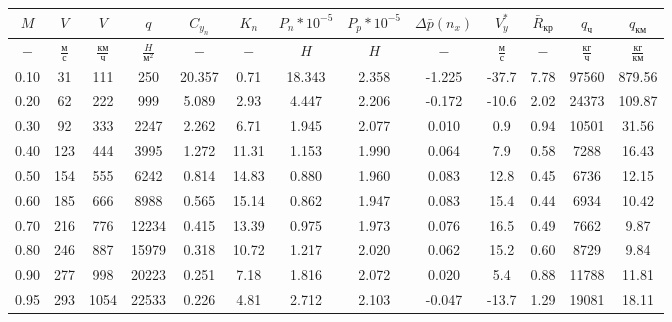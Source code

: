 \begin{tabular}{|c|c|c|c|c|c|c|c|c|c|c|c|c|}
\hline
$M$ & $V$ & $V$ & $q$ & $C_{y_n}$ & $K_n$ & $P_n*10^{-5}$ & $P_p*10^{-5}$ & $\Delta \bar{p}(n_x)$ & $V_y^*$ & $\bar{R}_{кр}$ & $q_{ч}$ & $q_{км}$ \\ 
\hline
$-$ & $\frac{м}{с}$ & $\frac{км}{ч}$ & $\frac{H}{м^2}$ & $-$ & $-$ & $H$ & $H$ & $-$ & $\frac{м}{с}$ & $-$ & $\frac{кг}{ч}$ & $\frac{кг}{км}$ \\ 
\hline
0.10 & 31 & 111 & 250 & 20.357 & 0.71 & 18.343 & 2.358 & -1.225 & -37.7 & 7.78 & 97560 & 879.56 \\ 
\hline
0.20 & 62 & 222 & 999 & 5.089 & 2.93 & 4.447 & 2.206 & -0.172 & -10.6 & 2.02 & 24373 & 109.87 \\ 
\hline
0.30 & 92 & 333 & 2247 & 2.262 & 6.71 & 1.945 & 2.077 & 0.010 & 0.9 & 0.94 & 10501 & 31.56 \\ 
\hline
0.40 & 123 & 444 & 3995 & 1.272 & 11.31 & 1.153 & 1.990 & 0.064 & 7.9 & 0.58 & 7288 & 16.43 \\ 
\hline
0.50 & 154 & 555 & 6242 & 0.814 & 14.83 & 0.880 & 1.960 & 0.083 & 12.8 & 0.45 & 6736 & 12.15 \\ 
\hline
0.60 & 185 & 666 & 8988 & 0.565 & 15.14 & 0.862 & 1.947 & 0.083 & 15.4 & 0.44 & 6934 & 10.42 \\ 
\hline
0.70 & 216 & 776 & 12234 & 0.415 & 13.39 & 0.975 & 1.973 & 0.076 & 16.5 & 0.49 & 7662 & 9.87 \\ 
\hline
0.80 & 246 & 887 & 15979 & 0.318 & 10.72 & 1.217 & 2.020 & 0.062 & 15.2 & 0.60 & 8729 & 9.84 \\ 
\hline
0.90 & 277 & 998 & 20223 & 0.251 & 7.18 & 1.816 & 2.072 & 0.020 & 5.4 & 0.88 & 11788 & 11.81 \\ 
\hline
0.95 & 293 & 1054 & 22533 & 0.226 & 4.81 & 2.712 & 2.103 & -0.047 & -13.7 & 1.29 & 19081 & 18.11 \\ 
\hline
\end{tabular}
